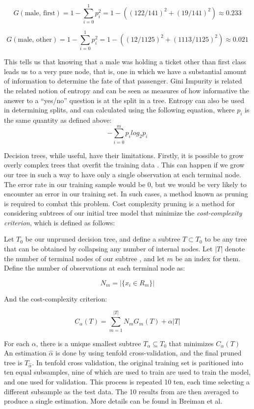 \documentclass[preprint,12pt]{elsarticle}
\begin{document}
$$G(\textrm{male, first}) = 1 - \sum\limits_{i=0}^1 p_{i}^{2} = 1 - ((122/141)^{2}+(19/141)^{2}) \approx 0.233 $$

$$G(\textrm{male, other}) = 1 - \sum\limits_{i=0}^1 p_{i}^{2} = 1 - ((12/1125)^{2}+(1113/1125)^{2}) \approx 0.021 $$

\noindent This tells us that knowing that a male was holding a ticket other than first class leads us to a very pure node, that is, one in which we have a substantial amount of information to determine the fate of that passenger. Gini Impurity is related the related notion of entropy and can be seen as measures of how informative the answer to a ``yes/no'' question is at the split in a tree. Entropy can also be used in determining splits, and can calculated using the following equation, where $p_{i}$ is the same quantity as defined above: 
$$-\sum\limits_{i=0}^m p_{i}log_{2}p_{i}$$

Decision trees, while useful, have their limitations. Firstly, it is possible to grow overly complex trees that overfit the training data \cite{ISLR}. This can happen if we grow our tree in such a way to have only a single observation at each terminal node. The error rate in our training sample would be $0$, but we would be very likely to encounter an error in our training set. In such cases, a method known as pruning is required to combat this problem. Cost complexity pruning is a method for considering subtrees of our initial tree model that minimize the \textit{cost-complexity criterion}, which is defined as follows\cite{ESL}:


Let $T_{0}$ be our unpruned decision tree, and define a subtree $T \subset T_{0}$ to be any tree that can be obtained by collapsing any number of internal nodes. Let $|T|$ denote the number of terminal nodes of our subtree , and let $m$ be an index for them. Define the number of observations at each terminal node as:

$$N_{m} = |\{x_{i} \in R_{m}\}| $$

\noindent And the cost-complexity criterion:

$$C_{\alpha}(T) = \sum\limits_{m=1}^{|T|} N_{m}G_{m}(T) + \alpha|T|$$

For each $\alpha$, there is a unique smallest subtree $T_{\alpha} \subseteq T_{0}$ that minimizes $C_{\alpha}(T)$ An estimation  $\hat{\alpha}$ is done by using tenfold cross-validation, and the final pruned tree is $T_{\hat{\alpha}}$. In tenfold cross validation, the original training set is paritioned into ten equal subsamples, nine of which are used to train are used to train the model, and one used for validation. This process is repeated 10 ten, each time selecting a different subsample as the test data. The 10 results from are then averaged to produce a single estimation. More details can be found in Breiman et al.\cite{Breiman1984}
\end{document}

